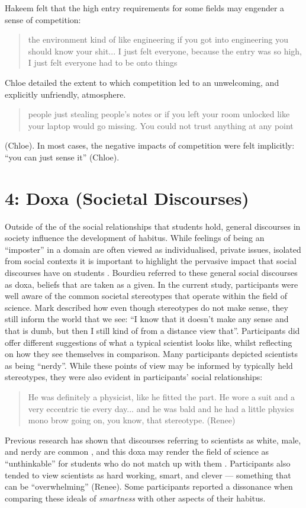 Hakeem felt that the high entry requirements for some fields may engender a sense of competition: \blockquote{the environment kind of like engineering if you got into engineering you should know your shit... I just felt everyone, because the entry was so high, I just felt everyone had to be onto things} Chloe detailed the extent to which competition led to an unwelcoming, and explicitly unfriendly, atmosphere. \blockquote{people just stealing people’s notes or if you left your room unlocked like your laptop would go missing. You could not trust anything at any point} (Chloe). In most cases, the negative impacts of competition were felt implicitly: ``you can just sense it'' (Chloe). 




\section{4: Doxa (Societal Discourses)}
Outside of the of the social relationships that students hold, general discourses in society influence the development of habitus. 
While feelings of being an ``imposter'' in a domain are often viewed as individualised, private issues, isolated from social contexts it is important to highlight the pervasive impact that social discourses have on students  \citep{breeze2018imposter}. Bourdieu referred to these general social discourses as doxa, beliefs that are taken as a given. In the current study, participants were well aware of the common societal stereotypes that operate within the field of science. Mark described how even though stereotypes do not make sense, they still inform the world that we see: ``I know that it doesn't make any sense and that is dumb, but then I still kind of from a distance view that''. Participants did offer different suggestions of what a typical scientist looks like, whilst reflecting on how they see themselves in comparison. Many participants depicted scientists as being ``nerdy''. While these points of view may be informed by typically held stereotypes, they were also evident in participants' social relationships: \blockquote{He was definitely a physicist, like he fitted the part. He wore a suit and a very eccentric tie every day... and he was bald and he had a little physics mono brow going on, you know, that stereotype. (Renee)} Previous research has shown that discourses referring to scientists as white, male, and nerdy are common \cite{Nosek_2009}, and this doxa may render the field of science as ``unthinkable'' for students who do not match up with them \cite{Archer_2013}. Participants also tended to view scientists as hard working, smart, and clever --- something that can be ``overwhelming'' (Renee). Some participants reported a dissonance when comparing these ideals of \textit{smartness} with other aspects of their habitus.

